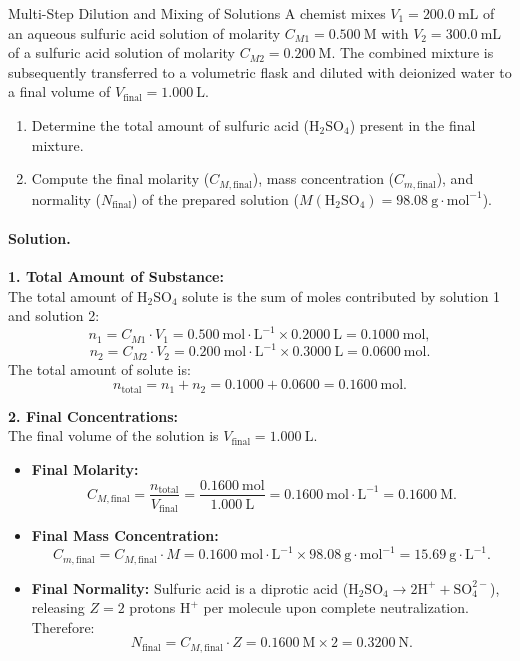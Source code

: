 \begin{workedexample}{Multi-Step Dilution and Mixing of Solutions}
A chemist mixes $V_1 = 200.0\ \mathrm{mL}$ of an aqueous sulfuric acid solution of molarity $C_{M1} = 0.500\ \mathrm{M}$ with $V_2 = 300.0\ \mathrm{mL}$ of a sulfuric acid solution of molarity $C_{M2} = 0.200\ \mathrm{M}$. The combined mixture is subsequently transferred to a volumetric flask and diluted with deionized water to a final volume of $V_{\text{final}} = 1.000\ \mathrm{L}$.
\begin{enumerate}[leftmargin=1.4em,itemsep=3pt]
  \item Determine the total amount of sulfuric acid ($\mathrm{H_2SO_4}$) present in the final mixture.
  \item Compute the final molarity ($C_{M,\text{final}}$), mass concentration ($C_{m,\text{final}}$), and normality ($N_{\text{final}}$) of the prepared solution ($M(\mathrm{H_2SO_4}) = 98.08\ \mathrm{g\cdot mol^{-1}}$).
\end{enumerate}

\paragraph{Solution.}
\textbf{1. Total Amount of Substance:}\\
The total amount of $\mathrm{H_2SO_4}$ solute is the sum of moles contributed by solution 1 and solution 2:
\[
n_1 = C_{M1} \cdot V_1 = 0.500\ \mathrm{mol\cdot L^{-1}} \times 0.2000\ \mathrm{L} = 0.1000\ \mathrm{mol},
\]
\[
n_2 = C_{M2} \cdot V_2 = 0.200\ \mathrm{mol\cdot L^{-1}} \times 0.3000\ \mathrm{L} = 0.0600\ \mathrm{mol}.
\]
The total amount of solute is:
\[
n_{\text{total}} = n_1 + n_2 = 0.1000 + 0.0600 = \mathbf{0.1600\ \mathrm{mol}}.
\]

\textbf{2. Final Concentrations:}\\
The final volume of the solution is $V_{\text{final}} = 1.000\ \mathrm{L}$.
\begin{itemize}[leftmargin=1.5em,itemsep=3pt]
  \item \textbf{Final Molarity:}
  \[
  C_{M,\text{final}} = \frac{n_{\text{total}}}{V_{\text{final}}} = \frac{0.1600\ \mathrm{mol}}{1.000\ \mathrm{L}} = \mathbf{0.1600\ \mathrm{mol\cdot L^{-1}} = 0.1600\ \mathrm{M}}.
  \]
  \item \textbf{Final Mass Concentration:}
  \[
  C_{m,\text{final}} = C_{M,\text{final}} \cdot M = 0.1600\ \mathrm{mol\cdot L^{-1}} \times 98.08\ \mathrm{g\cdot mol^{-1}} = \mathbf{15.69\ \mathrm{g\cdot L^{-1}}}.
  \]
  \item \textbf{Final Normality:}
  Sulfuric acid is a diprotic acid ($\mathrm{H_2SO_4} \to 2\mathrm{H}^+ + \mathrm{SO_4^{2-}}$), releasing $Z = 2$ protons $\mathrm{H}^+$ per molecule upon complete neutralization. Therefore:
  \[
  N_{\text{final}} = C_{M,\text{final}} \cdot Z = 0.1600\ \mathrm{M} \times 2 = \mathbf{0.3200\ \mathrm{N}}.
  \]
\end{itemize}
\end{workedexample}
